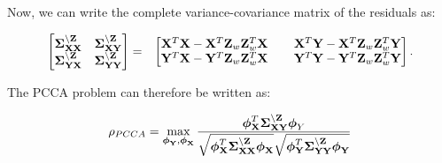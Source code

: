 \documentclass{llncs}
\newcommand{\X}{{\bf X}}
\newcommand{\Y}{{\bf Y}}
\newcommand{\Z}{{\bf Z}}
\newcommand{\bs}{\boldsymbol}
\newcommand{\bSigma}{\boldsymbol \Sigma}
\begin{document}
Now, we can write the complete variance-covariance matrix of the residuals as:

\begin{eqnarray}
\label{matrices}
\begin{bmatrix}
 \bs\Sigma_{\X\X}^{\backslash \Z} & \bs\Sigma_{\X\Y}^{\backslash \Z} \\
  \bs\Sigma_{\Y\X}^{\backslash \Z} & \bs\Sigma_{\Y\Y}^{\backslash \Z} 
\end{bmatrix}
&=&
\begin{bmatrix}
  \X^T\X -\X^T \Z_w\Z_w^T\X &\;\;\;\;   \X^T\Y -\X^T \Z_w\Z_w^T\Y\\
  \Y^T\X -\Y^T \Z_w\Z_w^T\X &\;\;\;\;   \Y^T\Y -\Y^T \Z_w\Z_w^T\Y
\end{bmatrix}
.
\end{eqnarray}






The PCCA problem can therefore be written as:

\begin{equation}
\label{pscca}
\rho_{PCCA}=\max_{{\bs\phi_{\Y}}, {\bs\phi_{\X}}} \frac{\bs\phi_{\X}^T \bs\Sigma_{\X\Y}^{\backslash \Z}\bs\phi_Y}{\sqrt{\bs\phi_{\X}^T\bs\Sigma_{\X\X}^{\backslash \Z}\bs\phi_{\X}}\sqrt{\bs\phi_{\Y}^T\bs\Sigma_{\Y\Y}^{\backslash \Z}\bs\phi_{\Y}}}
\end{equation}
\end{document}
